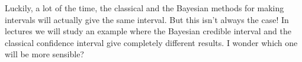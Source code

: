 Luckily, a lot of the time, the classical and the Bayesian methods for making
intervals will actually give the same interval. But this isn't always the case!
In lectures we will study an example where the Bayesian credible interval and
the classical confidence interval give completely different results. I wonder
which one will be more sensible?
